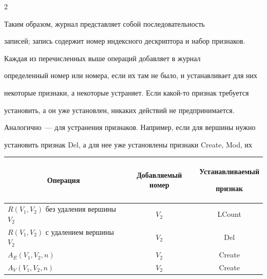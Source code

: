\begin{multicols}{2}
\begin{itemize}
\end{itemize}





      Таким образом, журнал представляет собой последовательность 


записей; запись содержит номер индексного дескриптора и набор признаков.


      


      Каждая из перечисленных выше операций добавляет в журнал 


определенный номер или номера, если их там не было, и устанавливает для них 


некоторые признаки, а некоторые устраняет. Если какой-то признак требуется 


установить, а он уже установлен, никаких действий не предпринимается. 


Аналогично~--- для устранения признаков. Например, если для вершины нужно 


установить признак Del, а для нее уже установлены признаки Create, Mod, их 


      \begin{table}\small


      \begin{center}




       \vspace*{2ex}


       


       \begin{tabular}{|l|c|c|}


       \hline


\multicolumn{1}{|c|}{Операция}&Добавляемый номер&Устанавливаемый 


признак \\


\hline


$R(V_1, V_2)$ без удаления вершины $V_2$&$V_2$&LCount\\


$R(V_1, V_2)$ с удалением вершины $V_2$&$V_2$&Del\\


$A_E(V_1, V_2, n)$&$V_2$&Create\\


$A_V(V_1, V_2, n)$&$V_2$&Create\\



\end{tabular}
\end{center}
\end{table}
\end{multicols}
